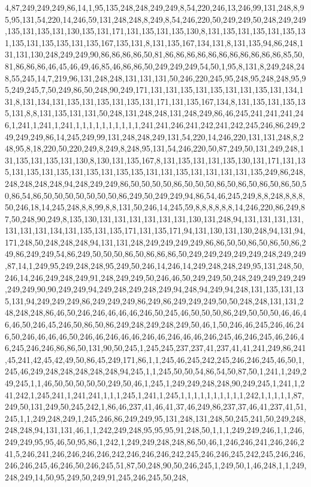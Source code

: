 4,87,249,249,249,86,14,1,95,135,248,248,249,249,8,54,220,246,13,246,99,131,248,8,95,95,131,54,220,14,246,59,131,248,248,8,249,8,54,246,220,50,249,249,50,248,249,249,135,131,135,131,130,135,131,171,131,135,131,135,130,8,131,135,131,135,131,135,131,135,131,135,135,131,135,167,135,131,8,131,135,167,134,131,8,131,135,94,86,248,131,131,130,248,249,249,90,86,86,86,86,50,81,86,86,86,86,86,86,86,86,86,86,86,85,50,81,86,86,86,46,45,46,49,46,85,46,86,86,50,249,249,249,54,50,1,95,8,131,8,249,248,248,55,245,14,7,219,96,131,248,248,131,131,131,50,246,220,245,95,248,95,248,248,95,95,249,245,7,50,249,86,50,248,90,249,171,131,131,135,131,135,131,131,135,131,134,131,8,131,134,131,135,131,135,131,135,131,171,131,135,167,134,8,131,135,131,135,135,131,8,8,131,135,131,131,50,248,131,248,248,131,248,249,86,46,245,241,241,241,246,1,241,1,241,1,241,1,1,1,1,1,1,1,1,1,1,241,241,246,241,242,241,242,245,246,86,249,249,249,249,86,14,245,249,99,131,248,248,249,131,54,220,14,246,220,131,131,248,8,248,95,8,18,220,50,220,249,8,249,8,248,95,131,54,246,220,50,87,249,50,131,249,248,131,135,131,135,131,130,8,130,131,135,167,8,131,135,131,131,135,130,131,171,131,135,131,135,131,135,131,135,131,135,135,131,131,135,131,131,131,131,135,249,86,248,248,248,248,248,94,248,249,249,86,50,50,50,50,86,50,50,50,86,50,86,50,86,50,86,50,50,86,54,86,50,50,50,50,50,50,50,86,249,50,249,249,94,86,54,46,245,249,8,8,248,8,8,8,50,246,18,14,245,248,8,8,99,8,8,131,50,246,14,245,59,8,8,8,8,8,8,14,246,220,86,249,87,50,248,90,249,8,135,130,131,131,131,131,131,131,130,131,248,94,131,131,131,131,131,131,131,134,131,135,131,135,171,131,135,171,94,131,130,131,130,248,94,131,94,171,248,50,248,248,248,94,131,131,248,249,249,249,249,86,86,50,50,86,50,86,50,86,249,86,249,249,54,86,249,50,50,50,86,50,86,86,86,50,249,249,249,249,249,248,249,249,87,14,1,249,95,249,248,248,95,249,50,246,14,246,14,249,248,248,249,95,131,248,50,246,14,246,249,248,249,91,248,249,249,50,246,46,50,249,249,50,248,249,249,249,249,249,249,90,90,249,249,94,249,248,249,248,249,94,248,94,249,94,248,131,135,131,135,131,94,249,249,249,86,249,249,249,86,249,86,249,249,249,50,50,248,248,131,131,248,248,248,86,46,50,246,246,46,46,46,246,50,245,46,50,50,50,86,249,50,50,50,46,46,46,46,50,246,45,246,50,86,50,86,249,248,249,248,249,50,46,1,50,246,46,245,246,46,246,50,246,46,46,46,50,246,46,246,46,46,246,46,246,46,46,246,245,46,246,245,46,246,46,245,246,246,86,86,50,131,90,50,245,1,245,245,237,237,41,237,41,41,241,249,86,241,45,241,42,45,42,49,50,86,45,249,171,86,1,1,245,46,245,242,245,246,246,245,46,50,1,245,46,249,248,248,248,248,248,94,245,1,1,245,50,50,54,86,54,50,87,50,1,241,1,249,249,245,1,1,46,50,50,50,50,50,249,50,46,1,245,1,249,249,248,248,90,249,245,1,241,1,241,242,1,245,241,1,241,241,1,1,1,245,1,241,1,245,1,1,1,1,1,1,1,1,1,1,242,1,1,1,1,1,87,249,50,131,249,50,245,242,1,86,46,237,41,46,41,37,46,249,86,237,37,46,41,237,41,51,245,1,1,249,248,249,1,245,246,86,249,249,95,131,248,131,248,50,245,241,50,249,248,248,248,94,131,131,46,1,1,242,249,248,95,95,95,91,248,50,1,1,1,249,249,246,1,1,246,249,249,95,95,46,50,95,86,1,242,1,249,249,248,248,86,50,46,1,246,246,241,246,246,241,5,246,241,246,246,246,246,242,246,246,246,242,245,246,246,245,242,245,246,246,246,246,245,46,246,50,246,245,51,87,50,248,90,50,246,245,1,249,50,1,46,248,1,1,249,248,249,14,50,95,249,50,249,91,245,246,245,50,248,